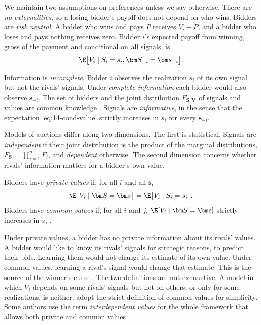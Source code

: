 We maintain two assumptions on preferences unless we say otherwise. There are \emph{no externalities}, so a
losing bidder's payoff does not depend on who wins. Bidders are \emph{risk neutral}. A bidder who wins and
pays $P$ receives $V_i-P$, and a bidder who loses and pays nothing receives zero. Bidder $i$'s expected
payoff from winning, gross of the payment and conditional on all signals, is
\begin{equation}\label{eq:14-cond-value}
\E\bigl[V_i\mid S_i=s_i,\bm S_{-i}=\bm s_{-i}\bigr].
\end{equation}

Information is \emph{incomplete}. Bidder $i$ observes the realization $s_i$ of its own signal but not the
rivals' signals. Under \emph{complete information} each bidder would also observe $\bm s_{-i}$. The set of
bidders and the joint distribution $F_{\bm S,\bm V}$ of signals and values are common knowledge
\citep[Section~2.1]{AtheyHaile2007}. Signals are \emph{informative}, in the sense that the expectation
\eqref{eq:14-cond-value} strictly increases in $s_i$ for every $\bm s_{-i}$.

Models of auctions differ along two dimensions. The first is statistical. Signals are \emph{independent} if
their joint distribution is the product of the marginal distributions, $F_{\bm S}=\prod_{i=1}^{n}F_i$, and
\emph{dependent} otherwise. The second dimension concerns whether rivals' information matters for a
bidder's own value.

\begin{definition}\label{def:14-private-values}
Bidders have \emph{private values} if, for all $i$ and all $\bm s$,
\begin{equation}\label{eq:14-pv-def}
\E\bigl[V_i\mid \bm S=\bm s\bigr]=\E\bigl[V_i\mid S_i=s_i\bigr].
\end{equation}
Bidders have \emph{common values} if, for all $i$ and $j$, $\E[V_i\mid\bm S=\bm s]$ strictly increases in
$s_j$ \citep[Definition~2.1]{AtheyHaile2007}.
\end{definition}

Under private values, a bidder has no private information about its rivals' values. A bidder would like to
know its rivals' signals for strategic reasons, to predict their bids. Learning them would not change its
estimate of its own value. Under common values, learning a rival's signal would change that estimate. This
is the source of the winner's curse \citep[Section~2.1]{AtheyHaile2007}. The two definitions are not
exhaustive. A model in which $V_i$ depends on some rivals' signals but not on others, or only for some
realizations, is neither. \citet[footnote~6]{AtheyHaile2007} adopt the strict definition of common values
for simplicity. Some authors use the term \emph{interdependent values} for the whole framework that allows
both private and common values \citep[footnote~8]{AtheyHaile2007}.

